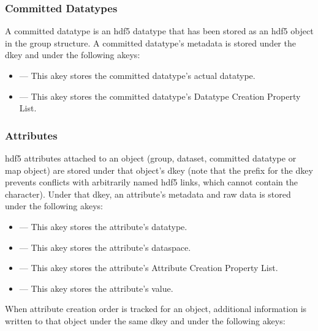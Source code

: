 \documentclass[../design_doc.tex]{subfiles}
\begin{document}
\subsubsection{Committed Datatypes}

A committed datatype is an \acrshort{hdf5} datatype that has been stored as an \acrshort{hdf5} object in the group structure. A committed datatype's metadata is stored under the  \gls{dkey} and under the following \glspl{akey}:

\begin{itemize}
    \item {} --- This \gls{akey} stores the committed datatype's actual datatype.
    \item {} --- This \gls{akey} stores the committed datatype's Datatype Creation Property List.
\end{itemize}


\newpage

\subsubsection{Attributes}

\acrshort{hdf5} attributes attached to an object (group, dataset, committed datatype or map object) are stored under that object's  \gls{dkey} (note that the \mintcinline{/} prefix for the  \gls{dkey} prevents conflicts with arbitrarily named \acrshort{hdf5} links, which cannot contain the \mintcinline{/} character). Under that \gls{dkey}, an attribute's metadata and raw data is stored under the following \glspl{akey}:

\begin{itemize}
 \item {} --- This \gls{akey} stores the attribute's datatype.
 \item {} --- This \gls{akey} stores the attribute's dataspace.
 \item {} --- This \gls{akey} stores the attribute's Attribute Creation Property List.
 \item {} --- This \gls{akey} stores the attribute's value.
\end{itemize}

When attribute creation order is tracked for an object, additional information is written to that object under the same  \gls{dkey} and under the following \glspl{akey}:
\end{document}
